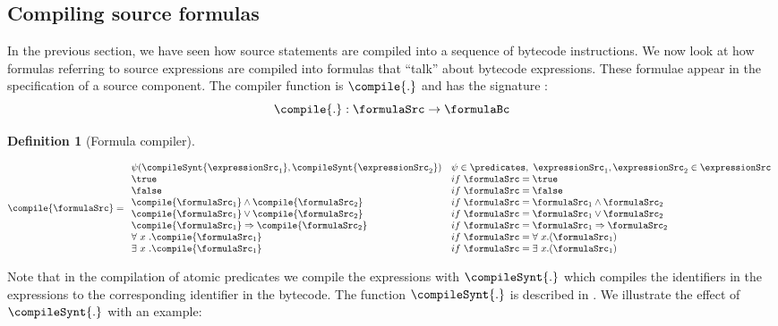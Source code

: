 \newtheorem{formulaComp}{Definition}
\newtheorem{formulaCompProp0}{Property}
\newtheorem{formulaCompProp1}[formulaCompProp0]{Property}
\newtheorem{formulaCompProp2}[formulaCompProp0]{Property}



\subsection{Compiling source formulas }
In the previous section, we have seen how source statements are compiled into a sequence of bytecode instructions.
 We now look at how formulas referring to source expressions are compiled into formulas that ``talk'' about bytecode expressions. 
These formulae appear in the specification of  a source component. 
The compiler function is $\compile{.} $ and has the signature :
$$ \compile{.} : \formulaSrc \rightarrow \formulaBc$$ 

\begin{formulaComp}[Formula compiler]
\end{formulaComp} 
$$
\compile{ \formulaSrc } =
\begin{array}{ll}
 \psi(\compileSynt{\expressionSrc_1},\compileSynt{\expressionSrc_2} ) & \psi \in \predicates, \  \expressionSrc_1 ,  \expressionSrc_2 \in \expressionSrc \\ 
\true & if \  \formulaSrc = \true \\
\false & if \  \formulaSrc = \false \\
\compile{ \formulaSrc_1 } \wedge \compile{ \formulaSrc_2 } & if \  \formulaSrc = \formulaSrc_1 \wedge \formulaSrc_2 \\
\compile{ \formulaSrc_1 } \vee \compile{ \formulaSrc_2 } & if \  \formulaSrc = \formulaSrc_1 \vee \formulaSrc_2 \\
 \compile{ \formulaSrc_1 } \Rightarrow \compile{ \formulaSrc_2 } & if \  \formulaSrc = \formulaSrc_1 \Rightarrow \formulaSrc_2 \\
 \forall \ x \ . \compile{ \formulaSrc_1 } & if \  \formulaSrc = \forall \ x . ( \formulaSrc_1)  \\
 \exists \ x \ . \compile{ \formulaSrc_1 } & if \  \formulaSrc = \exists \ x . ( \formulaSrc_1)  

\end{array} 
$$
 
Note that in the compilation of atomic predicates we compile the expressions with $ \compileSynt{.}$ 
which compiles the identifiers in the expressions
to the corresponding identifier in the bytecode. The function $ \compileSynt{.}$ is described in \cite{JML2BCSpec}.
We illustrate the effect of  $ \compileSynt{.}$ with an example: 

